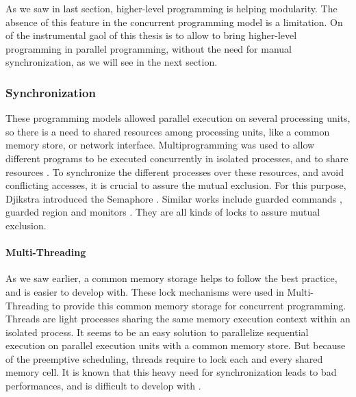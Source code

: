 
As we saw in last section, higher-level programming is helping modularity.
The absence of this feature in the concurrent programming model is a limitation.
On of the instrumental gaol of this thesis is to allow to bring higher-level programming in parallel programming, without the need for manual synchronization, as we will see in the next section.



\subsubsection{Synchronization}

These programming models allowed parallel execution on several processing units, so there is a need to shared resources among processing units, like a common memory store, or network interface.
Multiprogramming was used to allow different programs to be executed concurrently in isolated processes, and to share resources \cite{Dijkstra1968}.
To synchronize the different processes over these resources, and avoid conflicting accesses, it is crucial to assure the mutual exclusion.
For this purpose, Djikstra introduced the Semaphore \cite{Dijkstra}.
Similar works include guarded commands \cite{Dijkstra1975}, guarded region \cite{Hansen1978a} and monitors \cite{Hoare1974}.
They are all kinds of locks to assure mutual exclusion.



\paragraph{Multi-Threading}

As we saw earlier, a common memory storage helps to follow the best practice, and is easier to develop with.
These lock mechanisms were used in Multi-Threading to provide this common memory storage for concurrent programming.
Threads are light processes sharing the same memory execution context within an isolated process.
It seems to be an easy solution to parallelize sequential execution on parallel execution units with a common memory store.
But because of the preemptive scheduling, threads require to lock each and every shared memory cell.
It is known that this heavy need for synchronization leads to bad performances, and is difficult to develop with \cite{Adya2002}.

